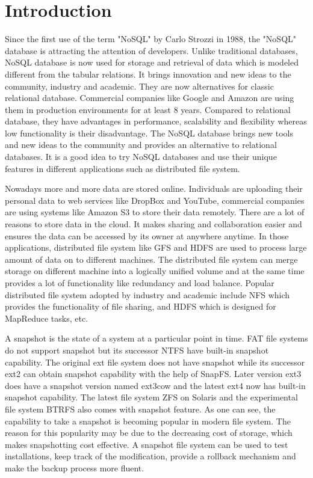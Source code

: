 \chapter{Introduction}
\label{chap-one}

Since the first use of the term "NoSQL" by Carlo Strozzi in 1988, the "NoSQL" database is attracting the attention of developers. Unlike traditional databases, NoSQL database is now used for storage and retrieval of data which is modeled different from the tabular relations. It brings innovation and new ideas to the community, industry and academic. They are now alternatives for classic relational database. Commercial companies like Google and Amazon are using them in production environments for at least 8 years. Compared to relational database, they have advantages in performance, scalability and flexibility whereas low functionality is their disadvantage. The NoSQL database brings new tools and new ideas to the community and provides an alternative to relational databases. It is a good idea to try NoSQL databases and use their unique features in different applications such as distributed file system.

    Nowadays more and more data are stored online. Individuals are uploading their personal data to web services like DropBox and YouTube, commercial companies are using systems like Amazon S3 to store their data remotely. There are a lot of reasons to store data in the cloud. It makes sharing and collaboration easier and ensures the data can be accessed by its owner at anywhere anytime. In those applications, distributed file system like GFS and HDFS are used to process large amount of data on to different machines. The distributed file system can merge storage on different machine into a logically unified volume and at the same time provides a lot of functionality like redundancy and load balance. Popular distributed file system adopted by industry and academic include NFS which provides the functionality of file sharing, and HDFS which is designed for MapReduce tasks, etc.

    A snapshot is the state of a system at a particular point in time. FAT file systems do not support snapshot but its successor NTFS have built-in snapshot capability. The original ext file system does not have snapshot while its successor ext2 can obtain snapshot capability with the help of SnapFS. Later version ext3 does have a snapshot version named ext3cow and the latest ext4 now has built-in snapshot capability. The latest file system ZFS on Solaris and the experimental file system BTRFS also comes with snapshot feature. As one can see, the capability to take a snapshot is becoming popular in modern file system. The reason for this popularity may be due to the decreasing cost of storage, which makes snapshotting cost effective. A snapshot file system can be used to test installations, keep track of the modification, provide a rollback mechanism and make the backup process more fluent.


